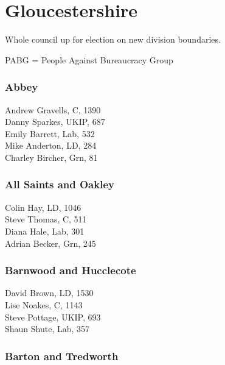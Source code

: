 \documentclass[a4paper,openany,10pt]{book}
\begin{document}
\vfill

\section{Gloucestershire}

Whole council up for election on new division boundaries.

PABG = People Against Bureaucracy Group



\subsubsection*{Abbey}



Andrew Gravells, C, 1390\\
Danny Sparkes, UKIP, 687\\
Emily Barrett, Lab, 532\\
Mike Anderton, LD, 284\\
Charley Bircher, Grn, 81\\


\subsubsection*{All Saints and Oakley}



Colin Hay, LD, 1046\\
Steve Thomas, C, 511\\
Diana Hale, Lab, 301\\
Adrian Becker, Grn, 245\\


\subsubsection*{Barnwood and Hucclecote}



David Brown, LD, 1530\\
Lise Noakes, C, 1143\\
Steve Pottage, UKIP, 693\\
Shaun Shute, Lab, 357\\


\subsubsection*{Barton and Tredworth}
\end{document}
